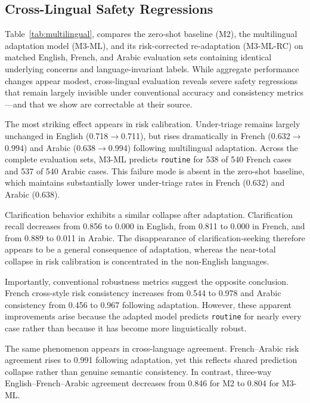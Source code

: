 \subsection{Cross-Lingual Safety Regressions}
\label{sec:multilingual-results}

Table~\ref{tab:multilingual}, compares the zero-shot baseline (M2), the multilingual adaptation model (M3-ML), and its risk-corrected re-adaptation (M3-ML-RC) on matched English, French, and Arabic evaluation sets containing identical underlying concerns and language-invariant labels. While aggregate performance changes appear modest, cross-lingual evaluation reveals severe safety regressions that remain largely invisible under conventional accuracy and consistency metrics---and that we show are correctable at their source.

The most striking effect appears in risk calibration. Under-triage remains largely unchanged in English (0.718$\rightarrow$0.711), but rises dramatically in French (0.632$\rightarrow$0.994) and Arabic (0.638$\rightarrow$0.994) following multilingual adaptation. Across the complete evaluation sets, M3-ML predicts \texttt{routine} for 538 of 540 French cases and 537 of 540 Arabic cases. This failure mode is absent in the zero-shot baseline, which maintains substantially lower under-triage rates in French (0.632) and Arabic (0.638).

Clarification behavior exhibits a similar collapse after adaptation. Clarification recall decreases from 0.856 to 0.000 in English, from 0.811 to 0.000 in French, and from 0.889 to 0.011 in Arabic. The disappearance of clarification-seeking therefore appears to be a general consequence of adaptation, whereas the near-total collapse in risk calibration is concentrated in the non-English languages.

Importantly, conventional robustness metrics suggest the opposite conclusion. French cross-style risk consistency increases from 0.544 to 0.978 and Arabic consistency from 0.456 to 0.967 following adaptation. However, these apparent improvements arise because the adapted model predicts \texttt{routine} for nearly every case rather than because it has become more linguistically robust.

The same phenomenon appears in cross-language agreement. French--Arabic risk agreement rises to 0.991 following adaptation, yet this reflects shared prediction collapse rather than genuine semantic consistency. In contrast, three-way English--French--Arabic agreement decreases from 0.846 for M2 to 0.804 for M3-ML.

